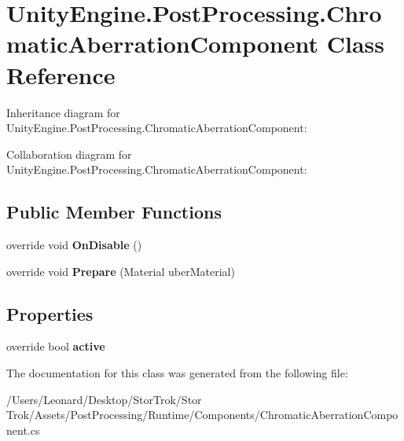 \hypertarget{class_unity_engine_1_1_post_processing_1_1_chromatic_aberration_component}{}\section{Unity\+Engine.\+Post\+Processing.\+Chromatic\+Aberration\+Component Class Reference}
\label{class_unity_engine_1_1_post_processing_1_1_chromatic_aberration_component}


Inheritance diagram for Unity\+Engine.\+Post\+Processing.\+Chromatic\+Aberration\+Component\+:


Collaboration diagram for Unity\+Engine.\+Post\+Processing.\+Chromatic\+Aberration\+Component\+:
\subsection*{Public Member Functions}
\begin{DoxyCompactItemize}
\item 
\mbox{\label{class_unity_engine_1_1_post_processing_1_1_chromatic_aberration_component_aa88d860317b08f10454a6021dce03069}} 
override void {\bfseries On\+Disable} ()
\item 
\mbox{\label{class_unity_engine_1_1_post_processing_1_1_chromatic_aberration_component_acbf442cadd4fcb16e9008ecfd32698fa}} 
override void {\bfseries Prepare} (Material uber\+Material)
\end{DoxyCompactItemize}
\subsection*{Properties}
\begin{DoxyCompactItemize}
\item 
\mbox{\label{class_unity_engine_1_1_post_processing_1_1_chromatic_aberration_component_ab1fb32c83cea3eb44e199fe7b6fb05e5}} 
override bool {\bfseries active}
\end{DoxyCompactItemize}


The documentation for this class was generated from the following file\+:\begin{DoxyCompactItemize}
\item 
/\+Users/\+Leonard/\+Desktop/\+Stor\+Trok/\+Stor Trok/\+Assets/\+Post\+Processing/\+Runtime/\+Components/Chromatic\+Aberration\+Component.\+cs\end{DoxyCompactItemize}
